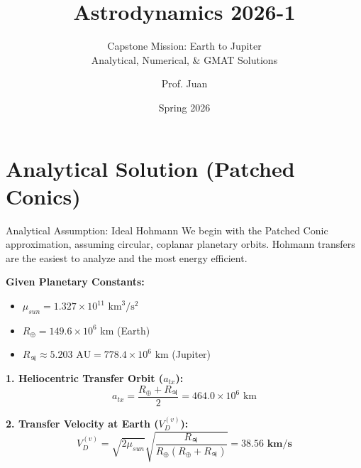 \documentclass[11pt]{beamer}
\title[Earth to Jupiter Mission Design]{Astrodynamics 2026-1}
\subtitle{Capstone Mission: Earth to Jupiter \\ Analytical, Numerical, \& GMAT Solutions}
\author{Prof. Juan}
\institute{Universidad de Antioquia - Aerospace Engineering}
\date{Spring 2026}
\begin{document}
\begin{frame}
    \titlepage
\end{frame}

\section{Analytical Solution (Patched Conics)}

\begin{frame}{Analytical Assumption: Ideal Hohmann}
    We begin with the Patched Conic approximation, assuming circular, coplanar planetary orbits. Hohmann transfers are the easiest to analyze and the most energy efficient.
    
    \vspace{0.2cm}
    \textbf{Given Planetary Constants:}
    \begin{itemize}
        \item $\mu_{sun} = 1.327 \times 10^{11} \text{ km}^3/\text{s}^2$
        \item $R_{\oplus} = 149.6 \times 10^6 \text{ km}$ (Earth)
        \item $R_{\jupiter} \approx 5.203 \text{ AU} = 778.4 \times 10^6 \text{ km}$ (Jupiter)
    \end{itemize}
    
    \textbf{1. Heliocentric Transfer Orbit ($a_{tx}$):}
    \begin{equation}
        a_{tx} = \frac{R_{\oplus} + R_{\jupiter}}{2} = 464.0 \times 10^6 \text{ km}
    \end{equation}
    
    \textbf{2. Transfer Velocity at Earth ($V_{D}^{(v)}$):}
    \begin{equation}
        V_{D}^{(v)} = \sqrt{2\mu_{sun}}\sqrt{\frac{R_{\jupiter}}{R_{\oplus}(R_{\oplus}+R_{\jupiter})}} = \mathbf{38.56 \text{ km/s}}
    \end{equation}
\end{frame}
\end{document}
